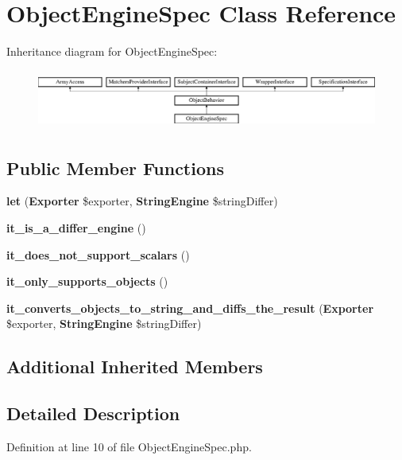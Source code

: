\section{Object\+Engine\+Spec Class Reference}
\label{classspec_1_1_php_spec_1_1_formatter_1_1_presenter_1_1_differ_1_1_object_engine_spec}
Inheritance diagram for Object\+Engine\+Spec\+:\begin{figure}[H]
\begin{center}
\leavevmode
\includegraphics[height=1.953488cm]{classspec_1_1_php_spec_1_1_formatter_1_1_presenter_1_1_differ_1_1_object_engine_spec}
\end{center}
\end{figure}
\subsection*{Public Member Functions}
\begin{DoxyCompactItemize}
\item 
{\bf let} ({\bf Exporter} \$exporter, {\bf String\+Engine} \$string\+Differ)
\item 
{\bf it\+\_\+is\+\_\+a\+\_\+differ\+\_\+engine} ()
\item 
{\bf it\+\_\+does\+\_\+not\+\_\+support\+\_\+scalars} ()
\item 
{\bf it\+\_\+only\+\_\+supports\+\_\+objects} ()
\item 
{\bf it\+\_\+converts\+\_\+objects\+\_\+to\+\_\+string\+\_\+and\+\_\+diffs\+\_\+the\+\_\+result} ({\bf Exporter} \$exporter, {\bf String\+Engine} \$string\+Differ)
\end{DoxyCompactItemize}
\subsection*{Additional Inherited Members}


\subsection{Detailed Description}


Definition at line 10 of file Object\+Engine\+Spec.\+php.



